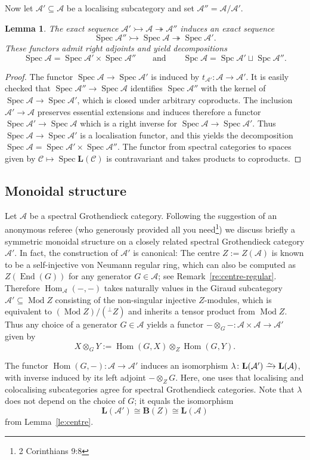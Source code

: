\documentclass[a4paper]{amsart}
\theoremstyle{plain}
\newtheorem{lem}[thm]{Lemma}
\theoremstyle{definition}
\theoremstyle{remark}
\numberwithin{equation}{section}
\newcommand{\End}{\operatorname{End}}
\newcommand{\Hom}{\operatorname{Hom}}
\newcommand{\Mod}{\operatorname{Mod}}
\newcommand{\Spc}{\operatorname{Spc}}
\newcommand{\Spec}{\operatorname{Spec}}
\newcommand{\iso}{\xrightarrow{\raisebox{-.4ex}[0ex][0ex]{$\scriptstyle{\sim}$}}}
\def\A{\mathcal A}
\def\C{\mathcal C}
\def\bfB{\mathbf B}
\def\bfL{\mathbf L}
\begin{document}
Now let $\A'\subseteq\A$ be a localising subcategory and set
$\A''=\A/\A'$.

\begin{lem}
The exact sequence
$\A'\rightarrowtail\A\twoheadrightarrow\A''$ induces an exact sequence
\[\Spec \A''\rightarrowtail\Spec\A\twoheadrightarrow\Spec\A'.\]
These functors admit right adjoints and yield  decompositions
\[\Spec\A=\Spec\A'\times\Spec\A''\qquad\text{and}\qquad \Spc\A=\Spc\A'\sqcup\Spc\A''.\]
\end{lem}
\begin{proof}
  The functor $\Spec\A\to\Spec\A'$ is induced by
  $t_{\A'}\colon\A\to\A'$. It is easily checked that
  $\Spec \A''\to\Spec\A$ identifies $\Spec \A''$ with the kernel of
  $\Spec\A\to\Spec\A'$, which is closed under arbitrary
  coproducts. The inclusion $\A'\to\A$ preserves essential extensions
  and induces therefore a functor $\Spec\A'\to\Spec\A$ which is a
  right inverse for $\Spec\A\to\Spec\A'$. Thus $\Spec\A\to\Spec\A'$ is
  a localisation functor, and this yields the decomposition
  $\Spec\A=\Spec\A'\times\Spec\A''$. The functor from spectral
  categories to spaces given by $\C\mapsto\Spec\bfL(\C)$ is
  contravariant and takes products to coproducts.
\end{proof}

\subsection*{Monoidal structure}

Let $\A$ be a spectral Grothendieck category. Following the suggestion
of an anonymous referee (who generously provided all you
need\footnote{2 Corinthians 9:8}) we discuss briefly a symmetric
monoidal structure on a closely related spectral Grothendieck category
$\A'$. In fact, the construction of $\A'$ is canonical: The centre $Z:=Z(\A)$ is known to be a self-injective
von Neumann regular ring, which can also be computed as $Z(\End(G))$
for any generator $G\in\A$; see
Remark~\ref{re:centre-regular}. Therefore $\Hom_\A(-,-)$ takes
naturally values in the Giraud subcategory $\A'\subseteq\Mod Z$
consisting of the non-singular injective $Z$-modules, which is
equivalent to $(\Mod Z)/({^\perp Z})$ and inherits a tensor product
from $\Mod Z$. Thus any choice of a generator $G\in\A$ yields a
functor $-\otimes_G-\colon\A\times \A\to\A'$ given by
\[X\otimes_G Y := \Hom(G,X)\otimes_Z\Hom(G,Y).\]

The functor $\Hom(G,-)\colon\A\to\A'$ induces an isomorphism
$\lambda\colon\bfL(\A')\iso\bfL(\A)$, with inverse induced by its left
adjoint $-\otimes_ZG$.  Here, one uses that localising and
colocalising subcategories agree for spectral Grothendieck categories.
Note that $\lambda$ does not depend on the
choice of $G$; it equals the isomorphism
\[\bfL(\A')\cong \bfB(Z)\cong\bfL(\A)\]
from Lemma~\ref{le:centre}.
\end{document}
